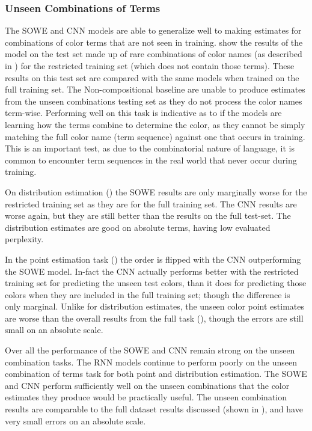 \documentclass[11pt,a4paper]{article}
\newcommand{\empmodel}{Non-compositional baseline}
\begin{document}
\subsubsection{Unseen Combinations of Terms}
The SOWE and CNN models are able to generalize well to making estimates for combinations of color terms that are not seen in training.
 show the results of the model on the test set made up of rare combinations of color names (as described in ) for the restricted training set (which does not contain those terms).
These results on this test set are compared with the same models when trained on the full training set.
The \empmodel{} are unable to produce estimates from the unseen combinations testing set as they do not process the color names term-wise.
Performing well on this task is indicative as to if the models are learning how the terms combine to determine the color, as they cannot be simply matching the full color name (term sequence) against one that occurs in training.
This is an important test, as due to the combinatorial nature of language,
it is common to encounter term sequences in the real world that never occur during training.


On distribution estimation () the SOWE results are only marginally worse for the restricted training set as they are for the full training set.
The CNN results are worse again, but they are still better than the results on the full test-set.
The distribution estimates are good on absolute terms, having low evaluated perplexity.

In the point estimation task () the order is flipped with the CNN outperforming the SOWE model.
In-fact the CNN actually performs better with the restricted training set for predicting the unseen test colors, than it does for predicting those colors when they are included in the full training set; though the difference is only marginal.
Unlike for distribution estimates, the unseen color point estimates are worse than the overall results from the full task (), though the errors are still small on an absolute scale.

Over all the performance of the SOWE and CNN remain strong on the unseen combination tasks.
The RNN models continue to perform poorly on the unseen combination of terms task for both point and distribution estimation.
The SOWE and CNN perform sufficiently well on the unseen combinations that the color estimates they produce would be practically useful.
The unseen combination results are comparable to the full dataset results discussed (shown in ), and have very small errors on an absolute scale.
\end{document}
